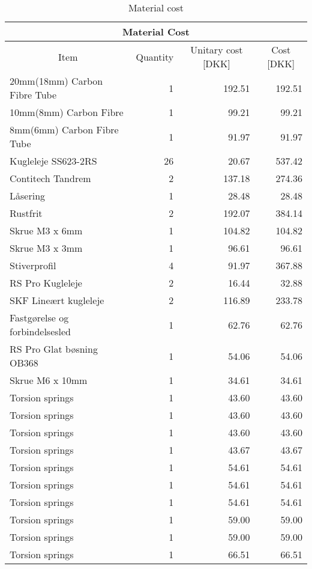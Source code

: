 \begin{table}[htbp]
\caption{Material cost}
\begin{tabular}{|l|r|r|r|}
\hline
\multicolumn{4}{|c|}{Material Cost} \\ \hline
\multicolumn{1}{|c|}{Item} & \multicolumn{1}{c|}{Quantity} & \multicolumn{1}{c|}{Unitary cost [DKK]} & \multicolumn{1}{c|}{Cost [DKK]} \\ \hline
20mm(18mm) Carbon Fibre Tube & 1 & 192.51 & 192.51 \\ \hline
10mm(8mm) Carbon Fibre & 1 & 99.21 & 99.21 \\ \hline
8mm(6mm) Carbon Fibre Tube & 1 & 91.97 & 91.97 \\ \hline
Kugleleje SS623-2RS & 26 & 20.67 & 537.42 \\ \hline
Contitech Tandrem & 2 & 137.18 & 274.36 \\ \hline
Låsering & 1 & 28.48 & 28.48 \\ \hline
Rustfrit & 2 & 192.07 & 384.14 \\ \hline
Skrue M3 x 6mm & 1 & 104.82 & 104.82 \\ \hline
Skrue M3 x 3mm & 1 & 96.61 & 96.61 \\ \hline
Stiverprofil & 4 & 91.97 & 367.88 \\ \hline
RS Pro Kugleleje & 2 & 16.44 & 32.88 \\ \hline
SKF Lineært kugleleje & 2 & 116.89 & 233.78 \\ \hline
Fastgørelse og forbindelsesled & 1 & 62.76 & 62.76 \\ \hline
RS Pro Glat bøsning OB368 & 1 & 54.06 & 54.06 \\ \hline
Skrue M6 x 10mm & 1 & 34.61 & 34.61 \\ \hline
Torsion springs & 1 & 43.60 & 43.60 \\ \hline
Torsion springs & 1 & 43.60 & 43.60 \\ \hline
Torsion springs & 1 & 43.60 & 43.60 \\ \hline
Torsion springs & 1 & 43.67 & 43.67 \\ \hline
Torsion springs & 1 & 54.61 & 54.61 \\ \hline
Torsion springs & 1 & 54.61 & 54.61 \\ \hline
Torsion springs & 1 & 54.61 & 54.61 \\ \hline
Torsion springs & 1 & 59.00 & 59.00 \\ \hline
Torsion springs & 1 & 59.00 & 59.00 \\ \hline
Torsion springs & 1 & 66.51 & 66.51 \\ \hline

\end{tabular}
\end{table}
